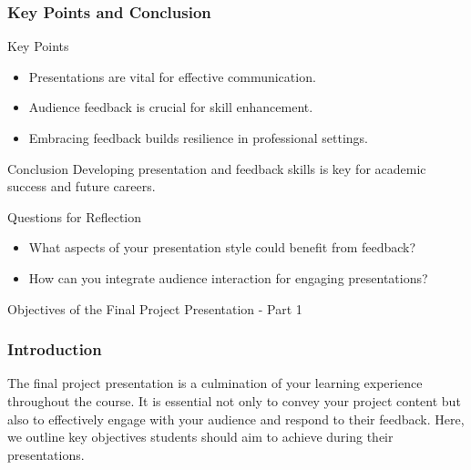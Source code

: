 \documentclass[aspectratio=169]{beamer}
\begin{document}
\begin{frame}[fragile]
    \frametitle{Key Points and Conclusion}
    \begin{block}{Key Points}
        \begin{itemize}
            \item Presentations are vital for effective communication.
            \item Audience feedback is crucial for skill enhancement.
            \item Embracing feedback builds resilience in professional settings.
        \end{itemize}
    \end{block}
    \begin{block}{Conclusion}
        Developing presentation and feedback skills is key for academic success and future careers.
    \end{block}
    \begin{block}{Questions for Reflection}
        \begin{itemize}
            \item What aspects of your presentation style could benefit from feedback?
            \item How can you integrate audience interaction for engaging presentations?
        \end{itemize}
    \end{block}
\end{frame}

\begin{frame}[fragile]{Objectives of the Final Project Presentation - Part 1}
    \frametitle{Introduction}
    The final project presentation is a culmination of your learning experience throughout the course. 
    It is essential not only to convey your project content but also to effectively engage with your audience and respond to their feedback. 
    Here, we outline key objectives students should aim to achieve during their presentations.
\end{frame}
\end{document}
